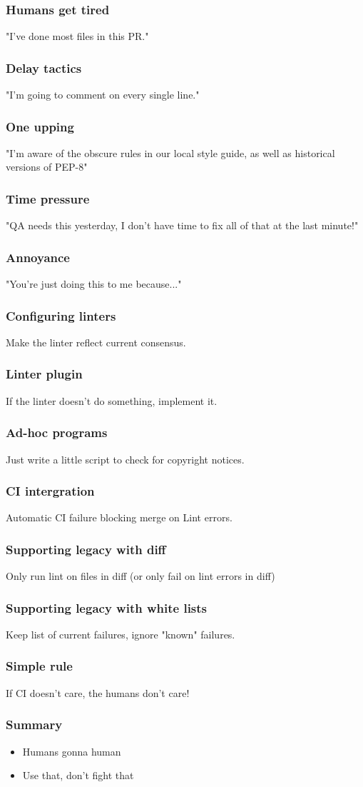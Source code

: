 \begin{frame}
\frametitle{Humans get tired}
"I've done most files in this PR."
\end{frame}

\begin{frame}
\frametitle{Delay tactics}
"I'm going to comment on every single line."
\end{frame}

\begin{frame}
\frametitle{One upping}
"I'm aware of the obscure rules in our local style guide,
as well as historical versions of PEP-8"
\end{frame}

\begin{frame}
\frametitle{Time pressure}
"QA needs this yesterday,
I don't have time to fix all of that at the last minute!"
\end{frame}

\begin{frame}
\frametitle{Annoyance}
"You're just doing this to me because..."
\end{frame}

\begin{frame}
\frametitle{Configuring linters}
Make the linter reflect current consensus.
\end{frame}

\begin{frame}
\frametitle{Linter plugin}
If the linter doesn't do something,
implement it.
\end{frame}

\begin{frame}
\frametitle{Ad-hoc programs}
Just write a little script to check for copyright notices.
\end{frame}

\begin{frame}
\frametitle{CI intergration}
Automatic CI failure blocking merge on Lint errors.
\end{frame}

\begin{frame}
\frametitle{Supporting legacy with diff}
Only run lint on files in diff
(or only fail on lint errors in diff)
\end{frame}

\begin{frame}
\frametitle{Supporting legacy with white lists}
Keep list of current failures,
ignore "known" failures.
\end{frame}

\begin{frame}
\frametitle{Simple rule}
If CI doesn't care,
the humans don't care!
\end{frame}

\begin{frame}
\frametitle{Summary}
\begin{itemize}
\item Humans gonna human
\item Use that, don't fight that
\end{itemize}
\end{frame}


